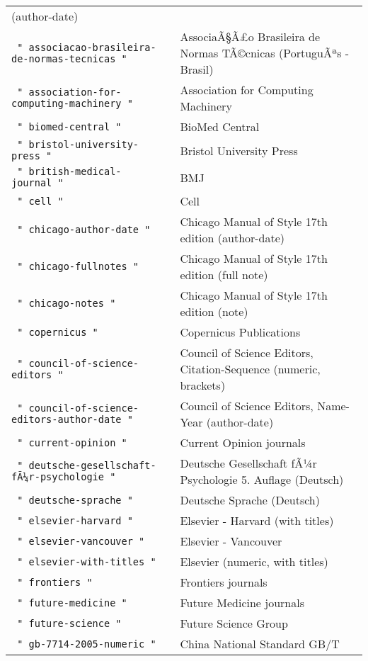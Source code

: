 \begin{longtable}[]{@{}ll@{}}
(author-date) \\
\texttt{\ "\ associacao-brasileira-de-normas-tecnicas\ "\ } &
AssociaÃ§Ã£o Brasileira de Normas TÃ©cnicas (PortuguÃªs - Brasil) \\
\texttt{\ "\ association-for-computing-machinery\ "\ } & Association for
Computing Machinery \\
\texttt{\ "\ biomed-central\ "\ } & BioMed Central \\
\texttt{\ "\ bristol-university-press\ "\ } & Bristol University
Press \\
\texttt{\ "\ british-medical-journal\ "\ } & BMJ \\
\texttt{\ "\ cell\ "\ } & Cell \\
\texttt{\ "\ chicago-author-date\ "\ } & Chicago Manual of Style 17th
edition (author-date) \\
\texttt{\ "\ chicago-fullnotes\ "\ } & Chicago Manual of Style 17th
edition (full note) \\
\texttt{\ "\ chicago-notes\ "\ } & Chicago Manual of Style 17th edition
(note) \\
\texttt{\ "\ copernicus\ "\ } & Copernicus Publications \\
\texttt{\ "\ council-of-science-editors\ "\ } & Council of Science
Editors, Citation-Sequence (numeric, brackets) \\
\texttt{\ "\ council-of-science-editors-author-date\ "\ } & Council of
Science Editors, Name-Year (author-date) \\
\texttt{\ "\ current-opinion\ "\ } & Current Opinion journals \\
\texttt{\ "\ deutsche-gesellschaft-fÃ¼r-psychologie\ "\ } & Deutsche
Gesellschaft fÃ¼r Psychologie 5. Auflage (Deutsch) \\
\texttt{\ "\ deutsche-sprache\ "\ } & Deutsche Sprache (Deutsch) \\
\texttt{\ "\ elsevier-harvard\ "\ } & Elsevier - Harvard (with
titles) \\
\texttt{\ "\ elsevier-vancouver\ "\ } & Elsevier - Vancouver \\
\texttt{\ "\ elsevier-with-titles\ "\ } & Elsevier (numeric, with
titles) \\
\texttt{\ "\ frontiers\ "\ } & Frontiers journals \\
\texttt{\ "\ future-medicine\ "\ } & Future Medicine journals \\
\texttt{\ "\ future-science\ "\ } & Future Science Group \\
\texttt{\ "\ gb-7714-2005-numeric\ "\ } & China National Standard GB/T

\end{longtable}
